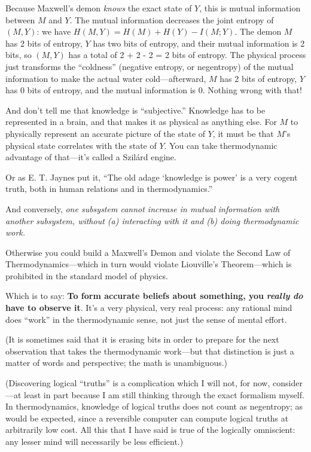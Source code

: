 {
 Because Maxwell's demon \textit{knows} the exact
state of $Y$, this is mutual information between $M$ and $Y$. The mutual
information decreases the joint entropy of $(M,Y)$: we have $H(M,Y) = H(M)
+ H(Y) - I(M;Y)$. The demon $M$ has 2 bits of entropy, $Y$ has two bits of
entropy, and their mutual information is 2 bits, so $(M,Y)$ has a total
of 2 + 2 - 2 = 2 bits of entropy. The physical process just transforms
the ``coldness'' (negative entropy,
or negentropy) of the mutual information to make the actual water
cold---afterward, $M$ has 2 bits of entropy, $Y$ has 0 bits of entropy, and
the mutual information is 0. Nothing wrong with that!}

{
 And don't tell me that knowledge is
``subjective.'' Knowledge has to be
represented in a brain, and that makes it as physical as anything else.
For $M$ to physically represent an accurate picture of the state of $Y$, it
must be that $M$'s physical state correlates with the
state of $Y$. You can take thermodynamic advantage of
that---it's called a Szilárd engine.}

{
 Or as E. T. Jaynes put it, ``The old adage
`knowledge is power' is a very cogent
truth, both in human relations and in
thermodynamics.''}

{
 And conversely, \textit{one subsystem cannot increase in mutual
information with another subsystem, without (a) interacting with it and
(b) doing thermodynamic work.}}

{
 Otherwise you could build a Maxwell's Demon and
violate the Second Law of Thermodynamics---which in turn would violate
Liouville's Theorem---which is prohibited in the
standard model of physics.}

{
 Which is to say: \textbf{To form accurate beliefs about something,
you }\textbf{\textit{really do}}\textbf{ have to observe it}.
It's a very physical, very real process: any rational
mind does ``work'' in the
thermodynamic sense, not just the sense of mental effort.}

{
 (It is sometimes said that it is erasing bits in order to prepare
for the next observation that takes the thermodynamic work---but that
distinction is just a matter of words and perspective; the math is
unambiguous.)}

{
 (Discovering logical ``truths''
is a complication which I will not, for now, consider---at least in
part because I am still thinking through the exact formalism myself. In
thermodynamics, knowledge of logical truths does not count as
negentropy; as would be expected, since a reversible computer can
compute logical truths at arbitrarily low cost. All this that I have
said is true of the logically omniscient: any lesser mind will
necessarily be less efficient.)}

